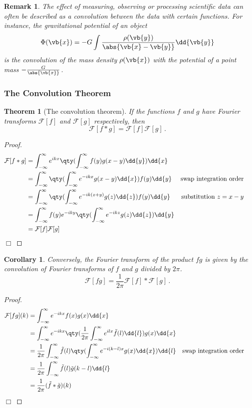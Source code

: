 \documentclass{article}
\theoremstyle{plain}\theoremheaderfont{\normalfont\itshape}\theorembodyfont{\rmfamily}\theoremseparator{.}\newtheorem*{rem}{Remark}\newtheorem*{ex}{Example}\newtheorem*{proof}{Proof}\newtheorem*{altp}{Alternative proof}
\theoremstyle{plain}\theoremheaderfont{\normalfont\bfseries}\theorembodyfont{\rmfamily}\theoremseparator{.}\newtheorem{thm}{Theorem}[section]\newtheorem{lem}[thm]{Lemma}\newtheorem{prop}[thm]{Proposition}\newtheorem*{cor}{Corollary}\newtheorem{defn}[thm]{Definition}\newtheorem{clm}[thm]{Claim}\newtheorem{clminproof}{Claim}
\theoremstyle{break}\theoremheaderfont{\normalfont\itshape}\theorembodyfont{\rmfamily}\theoremseparator{.\medskip}\newtheorem*{proofskip}{Proof}\newtheorem*{exs}{Examples}\newtheorem*{rems}{Remarks}
\theoremstyle{break}\theoremheaderfont{\normalfont\bfseries}\theorembodyfont{\rmfamily}\theoremseparator{.\medskip}\newtheorem{lemskip}[thm]{Lemma}\newtheorem{defnskip}[thm]{Definition}\newtheorem{propskip}[thm]{Proposition}\newtheorem{thmskip}[thm]{Theorem}
\numberwithin{equation}{section}
\newcommand{\qed}{\hfill\ensuremath{\Box}}
\begin{document}
	\begin{rem}
		The effect of measuring, observing or processing scientific data can often be described as a convolution between the data with certain functions. For instance, the gravitational potential of an object
		\[\Phi(\vb{x})=-G\int \frac{\rho(\vb{y})}{\abs{\vb{x}-\vb{y}}}\dd{\vb{y}}\]
		is the convolution of the mass density \(\rho(\vb{x})\) with the potential of a point mass \(-\frac{G}{\abs{\vb{x}}}\).
	\end{rem}
	
	\subsubsection{The Convolution Theorem}
	\begin{thm}[The convolution theorem]\label{conthm}	
		If the functions \(f\) and \(g\) have Fourier transforms \(\mathcal{F}[f]\) and \(\mathcal{F}[g]\) respectively, then
		\[\mathcal{F}[f*g]=\mathcal{F}[f]\mathcal{F}[g]\,.\]
	\end{thm}
	
	\begin{proof}
		\begin{align*}
			\mathcal{F}[f*g]&=\int_{-\infty}^{\infty}e^{ikx}\qty(\int_{-\infty}^{\infty}f(y)g(x-y)\dd{y})\dd{x}\\
			&=\int_{-\infty}^{\infty}\qty(\int_{-\infty}^{\infty}e^{-ikx}g(x-y)\dd{x}) f(y)\dd{y} & \text{swap integration order}&\\
			&=\int_{-\infty}^{\infty}\qty(\int_{-\infty}^{\infty}e^{-ik(z+y)}g(z)\dd{z}) f(y)\dd{y} & \text{substitution \(z=x-y\)}&\\
			&=\int_{-\infty}^{\infty}f(y)e^{-iky}\qty(\int_{-\infty}^{\infty}e^{-ikz}g(z)\dd{z})\dd{y}\\
			&=\mathcal{F}[f]\mathcal{F}[g]
		\end{align*}\qed
	\end{proof}
	
	\begin{cor}
		Conversely, the Fourier transform of the product \(fg\) is given by the convolution of Fourier transforms of \(f\) and \(g\) divided by \(2\pi\).
		\[\mathcal{F}[fg]=\frac{1}{2\pi}\mathcal{F}[f]*\mathcal{F}[g]\,.\]
	\end{cor}
	
	\begin{proof}
		\begin{align*}
			\mathcal{F}[fg](k)&=\int_{-\infty}^{\infty}e^{-ikx}f(x)g(x)\dd{x}\\
			&=\int_{-\infty}^{\infty}e^{-ikx}\qty(\frac{1}{2\pi}\int_{-\infty}^{\infty}e^{ilx}\tilde{f}(l)\dd{l})g(x)\dd{x}\\
			&=\frac{1}{2\pi}\int_{-\infty}^{\infty}\tilde{f}(l)\qty(\int_{-\infty}^{\infty}e^{-i(k-l)x}g(x)\dd{x})\dd{l} & \text{swap integration order}&\\
			&=\frac{1}{2\pi}\int_{-\infty}^{\infty}\tilde{f}(l)\tilde{g}(k-l)\dd{l}\\
			&=\frac{1}{2\pi}(\tilde{f}*\tilde{g})(k)
		\end{align*}\qed
	\end{proof}
	
\end{document}
